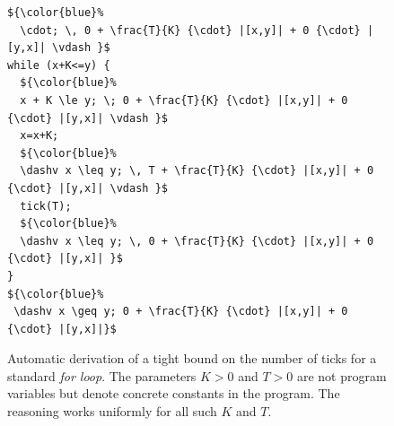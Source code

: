 \documentclass[nocopyrightspace,preprint]{sigplanconf}
\begin{document}

\begin{figure}[t]
  \centering
\begin{lstlisting}[mathescape]
${\color{blue}%
  \cdot; \, 0 + \frac{T}{K} {\cdot} |[x,y]| + 0 {\cdot} |[y,x]| \vdash }$
while (x+K<=y) {
  ${\color{blue}%
  x + K \le y; \; 0 + \frac{T}{K} {\cdot} |[x,y]| + 0 {\cdot} |[y,x]| \vdash }$
  x=x+K;
  ${\color{blue}%
  \dashv x \leq y; \, T + \frac{T}{K} {\cdot} |[x,y]| + 0 {\cdot} |[y,x]| \vdash }$
  tick(T);
  ${\color{blue}%
  \dashv x \leq y; \, 0 + \frac{T}{K} {\cdot} |[x,y]| + 0 {\cdot} |[y,x]| }$
}
${\color{blue}%
 \dashv x \geq y; 0 + \frac{T}{K} {\cdot} |[x,y]| + 0 {\cdot} |[y,x]|}$
\end{lstlisting}
  \caption{Automatic derivation of a tight bound on the number of
    ticks for a standard \emph{for loop}.  The parameters $K>0$ and
    $T>0$ are not program variables but denote concrete constants in
    the program.  The reasoning works uniformly for all such $K$ and
    $T$.}
  \label{fig:ex1}
\end{figure}


%
\newlength{\progwidth}
\end{document}
